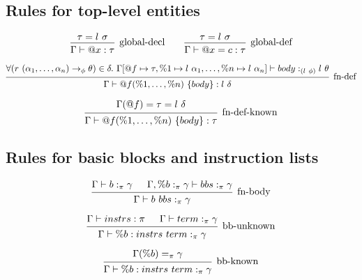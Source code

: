 \documentclass{article}
\begin{document}
\subsection{Rules for top-level entities}

\[    
\begin{prooftree}
    \hypo{\tau = l\ \sigma}
    \infer1[global-decl]{\Gamma \vdash @x : \tau}
\end{prooftree}
\qquad
\begin{prooftree}
    \hypo{\tau = l\ \sigma}
    \infer1[global-def]{\Gamma \vdash @x = c : \tau}
\end{prooftree}
\]

\[
\begin{prooftree}
    \hypo{
    \begin{matrix}
        \forall (r\ (\alpha_1, \dots, \alpha_n) \rightarrow_\phi \theta) \in \delta. \ 
        \Gamma[@f \mapsto \tau, \%1 \mapsto l\ \alpha_1, \ldots, \%n \mapsto l\ \alpha_n] \vdash body :_{(l\ \phi)} l\ \theta \\
    \end{matrix}
    }
    \infer1[fn-def]{\Gamma \vdash @f(\%1, \dots, \%n)\ \{ body \} : l\ \delta}
    
\end{prooftree}
\]

\[
\begin{prooftree}
    \hypo{
    \Gamma(@f) = \tau = l\ \delta
    }
    \infer1[fn-def-known]{\Gamma \vdash @f(\%1, \dots, \%n)\ \{ body \} : \tau}
\end{prooftree}
\]

\subsection{Rules for basic blocks and instruction lists}

\[
\begin{prooftree} 
    \hypo{\Gamma \vdash b :_\pi \gamma}
    \hypo{\Gamma, \%b :_\pi \gamma \vdash bbs :_\pi \gamma}
    \infer2[fn-body]{\Gamma \vdash b\ bbs :_\pi \gamma}
\end{prooftree} 
\]


\[
\begin{prooftree} 
    \hypo{\Gamma \vdash instrs : \pi}
    \hypo{\Gamma \vdash term :_\pi \gamma}
    \infer2[bb-unknown]{\Gamma \vdash \%b: instrs\ term :_\pi \gamma}
\end{prooftree} 
\]


\[
\begin{prooftree} 
    \hypo{\Gamma(\%b) =_\pi \gamma} 
    \infer1[bb-known]{\Gamma \vdash \%b: instrs\ term :_\pi \gamma}
\end{prooftree} 
\]
\end{document}
